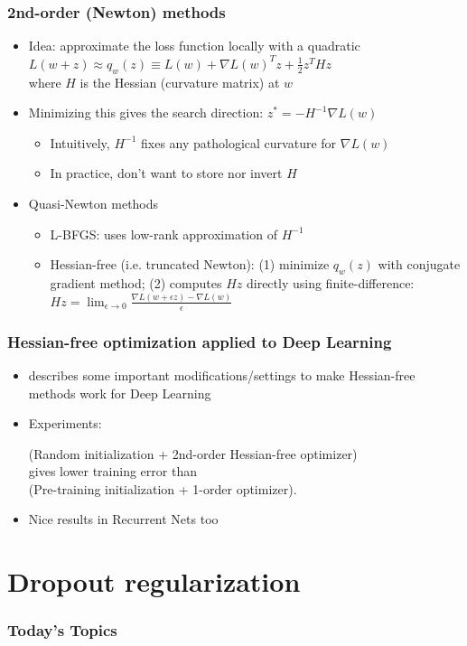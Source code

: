 \documentclass{beamer}
\newcommand{\bi}{\begin{itemize}}
\newcommand{\ei}{\end{itemize}}
\begin{document}
\begin{frame}
\frametitle{2nd-order (Newton) methods}
\bi
\item Idea: approximate the loss function locally with a quadratic\\[0.2cm]
$L(w+z) \approx q_w(z) \equiv L(w) + \nabla L(w)^T z + \frac{1}{2} z^T H z $\\[0.2cm]
\hspace{2cm} where $H$ is the Hessian (curvature matrix) at $w$\\[0.2cm]
\pause
\item Minimizing this gives the search direction: $z^{*}=-H^{-1}\nabla L(w) $
	\bi
	\item Intuitively, $H^{-1}$ fixes any pathological curvature for $\nabla L(w)$
	\item In practice, don't want to store nor invert $H$
	\ei
\pause
\item Quasi-Newton methods
	\bi 
	\item L-BFGS: uses low-rank approximation of $H^{-1}$
	\pause
	\item Hessian-free (i.e. truncated Newton): (1) minimize $q_w(z)$ with conjugate gradient method; (2) computes $Hz$ directly using finite-difference: $Hz = \lim_{\epsilon\rightarrow 0} \frac{\nabla L(w+\epsilon z) - \nabla L(w)}{\epsilon}$
	\ei
\ei
\end{frame}


\begin{frame}
\frametitle{Hessian-free optimization applied to Deep Learning}
\bi
\item \cite{martens10hessianfree} describes some important modifications/settings to make Hessian-free methods work for Deep Learning
\item Experiments:\\[0.2cm]
\begin{center}
(Random initialization + 2nd-order Hessian-free optimizer) \\[0.2cm]
 gives lower training error than \\[0.2cm]
 (Pre-training initialization + 1-order optimizer).\\[0.5cm] 
 \end{center}
 \item Nice results in Recurrent Nets too \cite{martens11recurrent}
\ei
\end{frame}


\section{Dropout regularization \cite{hinton12dropout}}
\begin{frame}
\frametitle{Today's Topics}
\tableofcontents
\end{frame}
\end{document}
